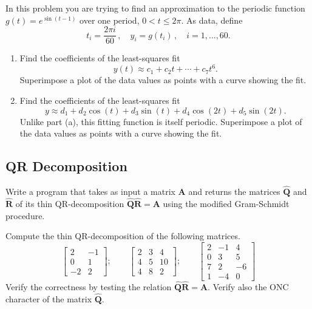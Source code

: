 \begin{exercise}
    In this problem you are trying to find an approximation to the periodic function $g(t)=e^{\sin(t-1)}$ over one period, $0 < t \le 2\pi$. As data, define
    \[
        t_i = \frac{2\pi i}{60}\,,
        \quad  
        y_i = g(t_i)\,,
        \quad i=1,\ldots,60.
    \]
    \begin{enumerate}[label=(\alph*)]
        \item Find the coefficients of the least-squares fit
        \[
            y(t) \approx c_1 + c_2t + \cdots + c_7 t^6.
        \]
        Superimpose a plot of the data values as points with a curve showing the fit.

        \item Find the coefficients of the least-squares fit
        \[
            y \approx d_1 + d_2\cos(t) + d_3\sin(t) + d_4\cos(2t) + d_5\sin(2t).
        \]
        Unlike part (a), this fitting function is itself periodic. Superimpose a plot of the data values as points with a curve showing the fit.
    \end{enumerate}
\end{exercise}

\subsection{QR Decomposition}
\begin{exercise}
    Write a program that takes as input a matrix $\mathbf{A}$ and returns the matrices $\hat{\mathbf{Q}}$ and $\hat{\mathbf{R}}$ of its thin QR-decomposition $\hat{\mathbf{Q}}\hat{\mathbf{R}}={\mathbf{A}}$ using the modified Gram-Schmidt procedure.
\end{exercise}

\begin{exercise}
    Compute the thin QR-decomposition of the following matrices.
    \[ 
        \begin{bmatrix}
            2 & -1 \\
            0 & 1 \\
            -2 & 2
        \end{bmatrix};
        \qquad
        \begin{bmatrix}
            2 & 3 & 4 \\
            4 & 5 & 10 \\
            4 & 8 & 2
        \end{bmatrix};
        \qquad
        \begin{bmatrix}
            2 & -1 & 4 \\
            0 & 3 & 5 \\
            7 & 2 & -6 \\
            1 & -4 & 0
        \end{bmatrix}
    \]
    Verify the correctness by testing the relation $\hat{\mathbf{Q}}\hat{\mathbf{R}}={\mathbf{A}}$. Verify also the ONC character of the matrix $\hat{\mathbf{Q}}$.
\end{exercise}

